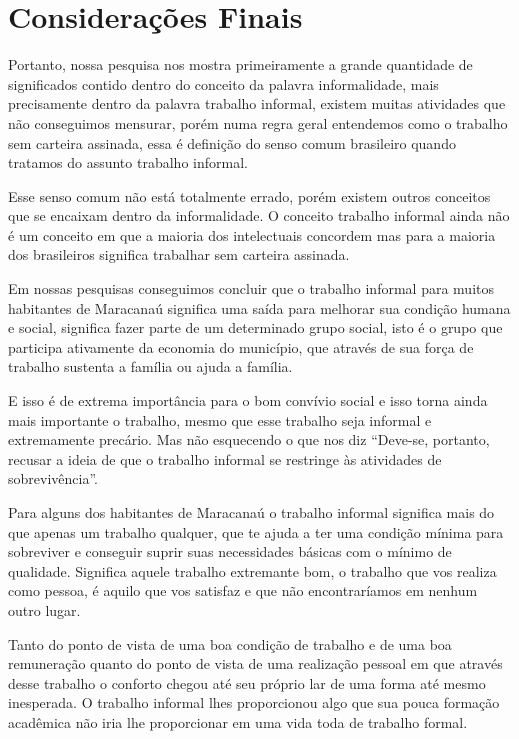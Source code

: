 \chapter{Considerações Finais}

Portanto, nossa pesquisa nos mostra primeiramente a grande quantidade de 
significados contido dentro do conceito da palavra informalidade, mais 
precisamente dentro da palavra trabalho informal, existem muitas atividades que 
não conseguimos mensurar, porém numa regra geral entendemos como o trabalho sem 
carteira assinada, essa é definição do senso comum brasileiro quando tratamos do 
assunto trabalho informal. 

Esse senso comum não está totalmente errado, porém 
existem outros conceitos que se encaixam dentro da informalidade. O conceito 
trabalho informal ainda não é um conceito em que a maioria dos intelectuais 
concordem mas para a maioria dos brasileiros significa trabalhar sem carteira 
assinada.

Em nossas pesquisas conseguimos concluir que o trabalho informal para muitos 
habitantes de Maracanaú significa uma saída para melhorar sua condição humana e 
social, significa fazer parte de um determinado grupo social, isto é o grupo que 
participa ativamente da economia do município, que através de sua força de 
trabalho sustenta a família ou ajuda a família. 

E isso é de extrema importância 
para o bom convívio social e isso torna ainda mais importante o trabalho, mesmo 
que esse trabalho seja informal e extremamente precário. Mas não esquecendo o 
que \cite{augusta} nos diz ``Deve-se, portanto, recusar a ideia de que o 
trabalho informal se restringe às atividades de sobrevivência''. 

Para alguns dos habitantes de Maracanaú o trabalho informal significa mais do 
que apenas um trabalho qualquer, que te ajuda a ter uma condição mínima para 
sobreviver e conseguir suprir suas necessidades básicas com o mínimo de 
qualidade. Significa aquele trabalho extremante bom, o trabalho que vos realiza 
como pessoa, é aquilo que vos satisfaz e que não encontraríamos em nenhum outro 
lugar. 

Tanto do ponto de vista de uma boa condição de trabalho e de uma boa 
remuneração quanto do ponto de vista de uma realização pessoal em que através 
desse trabalho o conforto chegou até seu próprio lar de uma forma até mesmo 
inesperada. O trabalho informal lhes proporcionou algo que sua pouca formação 
acadêmica não iria lhe proporcionar em uma vida toda de trabalho formal.

